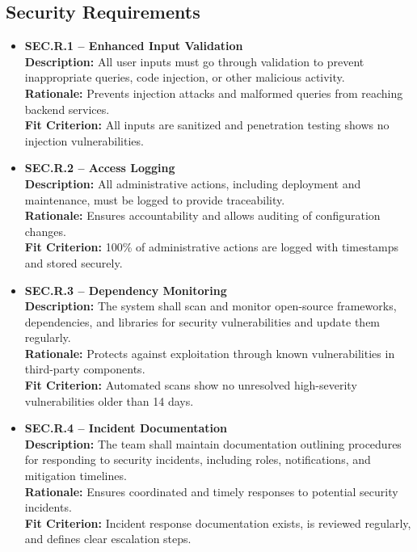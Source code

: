 \documentclass{article}
\begin{document}
\subsection{Security Requirements}
\begin{itemize}
    \item \textbf{SEC.R.1 -- Enhanced Input Validation} \\
    \textbf{Description:} All user inputs must go through validation to prevent inappropriate queries, code injection, or other malicious activity. \\
    \textbf{Rationale:} Prevents injection attacks and malformed queries from reaching backend services. \\
    \textbf{Fit Criterion:} All inputs are sanitized and penetration testing shows no injection vulnerabilities.
    
    \item \textbf{SEC.R.2 -- Access Logging} \\
    \textbf{Description:} All administrative actions, including deployment and maintenance, must be logged to provide traceability. \\
    \textbf{Rationale:} Ensures accountability and allows auditing of configuration changes. \\
    \textbf{Fit Criterion:} 100\% of administrative actions are logged with timestamps and stored securely.
    
    \item \textbf{SEC.R.3 -- Dependency Monitoring} \\
    \textbf{Description:} The system shall scan and monitor open-source frameworks, dependencies, and libraries for security vulnerabilities and update them regularly. \\
    \textbf{Rationale:} Protects against exploitation through known vulnerabilities in third-party components. \\
    \textbf{Fit Criterion:} Automated scans show no unresolved high-severity vulnerabilities older than 14 days.
    
    \item \textbf{SEC.R.4 -- Incident Documentation} \\
    \textbf{Description:} The team shall maintain documentation outlining procedures for responding to security incidents, including roles, notifications, and mitigation timelines. \\
    \textbf{Rationale:} Ensures coordinated and timely responses to potential security incidents. \\
    \textbf{Fit Criterion:} Incident response documentation exists, is reviewed regularly, and defines clear escalation steps.
    

\end{itemize}
\end{document}
